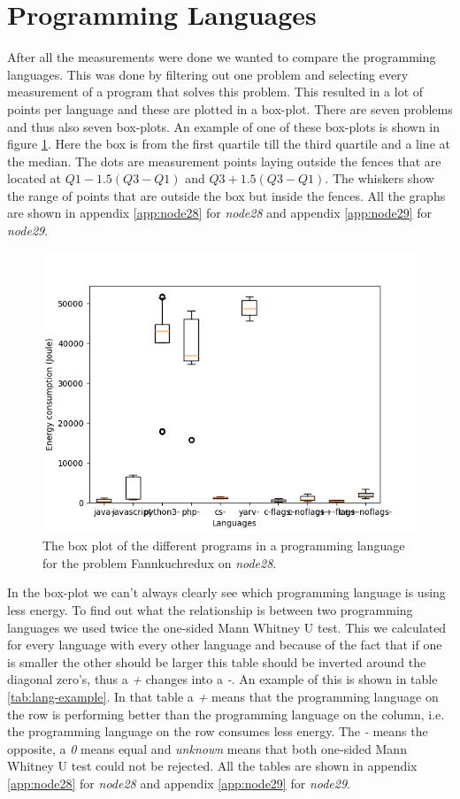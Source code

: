 \section{Programming Languages}
After all the measurements were done we wanted to compare the programming languages. This was done by filtering out one problem and selecting every measurement of a program that solves this problem. This resulted in a lot of points per language and these are plotted in a box-plot. There are seven problems and thus also seven box-plots. An example of one of these box-plots is shown in figure \ref{fig:box-example}. Here the box is from the first quartile till the third quartile and a line at the median. The dots are measurement points laying outside the fences that are located at $Q1 - 1.5(Q3-Q1)$ and $Q3 + 1.5(Q3-Q1)$. The whiskers show the range of points that are outside the box but inside the fences. All the graphs are shown in appendix \ref{app:node28} for \textit{node28} and appendix \ref{app:node29} for \textit{node29}.\\

\begin{figure}[h]
    \centering
    \includegraphics[width=.6\textwidth]{graphs/fannkuchredux_BOXoverview3.png}
    \caption{The box plot of the different programs in a programming language for the problem Fannkuchredux on \textit{node28}.}
    \label{fig:box-example}
\end{figure}

In the box-plot we can't always clearly see which programming language is using less energy. To find out what the relationship is between two programming languages we used twice the one-sided Mann Whitney U test. This we calculated for every language with every other language and because of the fact that if one is smaller the other should be larger this table should be inverted around the diagonal zero's, thus a \textit{+} changes into a \textit{-}. An example of this is shown in table \ref{tab:lang-example}. In that table a \textit{+} means that the programming language on the row is performing better than the programming language on the column, i.e. the programming language on the row consumes less energy. The \textit{-} means the opposite, a \textit{0} means equal and \textit{unknown} means that both one-sided Mann Whitney U test could not be rejected. All the tables are shown in appendix \ref{app:node28} for \textit{node28} and appendix \ref{app:node29} for \textit{node29}.\\

